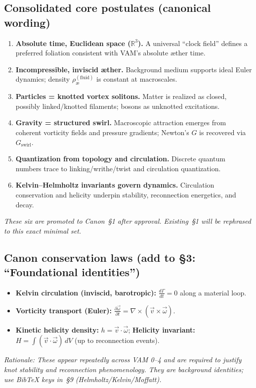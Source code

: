 \documentclass[11pt]{article}
\begin{document}
    \subsection{Consolidated core postulates (canonical wording)}
    \begin{enumerate}
        \item \textbf{Absolute time, Euclidean space ($\mathbb{R}^3$).} A universal ``clock field'' defines a preferred foliation consistent with VAM's absolute æther time.
        \item \textbf{Incompressible, inviscid æther.} Background medium supports ideal Euler dynamics; density $\rho_{\text{\ae}}^{(\text{fluid})}$ is constant at macroscales.
        \item \textbf{Particles = knotted vortex solitons.} Matter is realized as closed, possibly linked/knotted filaments; bosons as unknotted excitations.
        \item \textbf{Gravity = structured swirl.} Macroscopic attraction emerges from coherent vorticity fields and pressure gradients; Newton's $G$ is recovered via $G_{\text{swirl}}$.
        \item \textbf{Quantization from topology and circulation.} Discrete quantum numbers trace to linking/writhe/twist and circulation quantization.
        \item \textbf{Kelvin--Helmholtz invariants govern dynamics.} Circulation conservation and helicity underpin stability, reconnection energetics, and decay.
    \end{enumerate}
    \textit{These six are promoted to Canon~\S1 after approval. Existing~\S1 will be rephrased to this exact minimal set.}

    \subsection{Canon conservation laws (add to \S3: ``Foundational identities'')}
    \begin{itemize}
        \item \textbf{Kelvin circulation (inviscid, barotropic):} $\frac{d\Gamma}{dt} = 0$ along a material loop.
        \item \textbf{Vorticity transport (Euler):} $\frac{\partial\vec{\omega}}{\partial t} = \nabla \times (\vec{v} \times \vec{\omega})$.
        \item \textbf{Kinetic helicity density:} $h = \vec{v} \cdot \vec{\omega}$; \textbf{Helicity invariant:} $H = \int (\vec{v} \cdot \vec{\omega})\,dV$ (up to reconnection events).
    \end{itemize}
    \textit{Rationale: These appear repeatedly across VAM 0--4 and are required to justify knot stability and reconnection phenomenology. They are background identities; use BibTeX keys in~\S9 (Helmholtz/Kelvin/Moffatt).}
\end{document}
